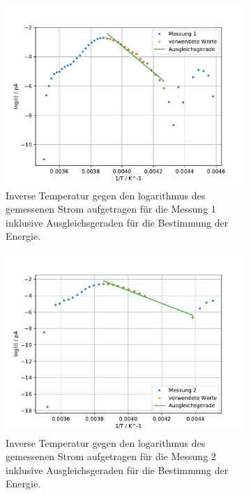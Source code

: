 \begin{figure}
  
  \centering
  \begin{subfigure}[b]{0.75\textwidth}
      \centering
      \includegraphics[width=\textwidth]{build_j/log(I)_1durchT_1.pdf}
      \caption{Inverse Temperatur gegen den logarithmus des gemessenen Strom aufgetragen für die Messung 1 inklusive Ausgleichsgeraden für die Bestimmung der Energie.}
  \end{subfigure}
  \hfill
  \begin{subfigure}[b]{0.75\textwidth}
      \centering
      \includegraphics[width=\textwidth]{build_j/log(I)_1durchT_2.pdf}
      \caption{Inverse Temperatur gegen den logarithmus des gemessenen Strom aufgetragen für die Messung 2 inklusive Ausgleichsgeraden für die Bestimmung der Energie.}
  \end{subfigure}
  \caption{}
  \label{fig:met1}
\end{figure}


